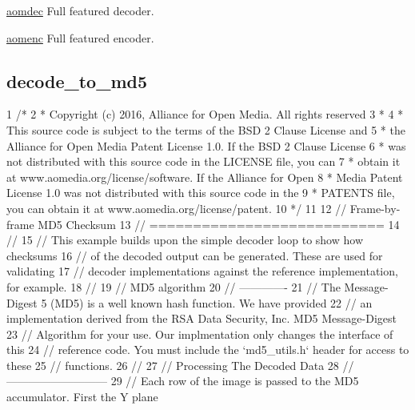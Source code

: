 \begin{DoxyItemize}
\item \hyperlink{example_aomdec}{aomdec} Full featured decoder.
\item \hyperlink{example_aomenc}{aomenc} Full featured encoder. 
\end{DoxyItemize}\hypertarget{example_decode_to_md5}{}\subsection{decode\+\_\+to\+\_\+md5}\label{example_decode_to_md5}

\begin{DoxyCodeInclude}
1 \textcolor{comment}{/*}
2 \textcolor{comment}{ * Copyright (c) 2016, Alliance for Open Media. All rights reserved}
3 \textcolor{comment}{ *}
4 \textcolor{comment}{ * This source code is subject to the terms of the BSD 2 Clause License and}
5 \textcolor{comment}{ * the Alliance for Open Media Patent License 1.0. If the BSD 2 Clause License}
6 \textcolor{comment}{ * was not distributed with this source code in the LICENSE file, you can}
7 \textcolor{comment}{ * obtain it at www.aomedia.org/license/software. If the Alliance for Open}
8 \textcolor{comment}{ * Media Patent License 1.0 was not distributed with this source code in the}
9 \textcolor{comment}{ * PATENTS file, you can obtain it at www.aomedia.org/license/patent.}
10 \textcolor{comment}{ */}
11 
12 \textcolor{comment}{// Frame-by-frame MD5 Checksum}
13 \textcolor{comment}{// ===========================}
14 \textcolor{comment}{//}
15 \textcolor{comment}{// This example builds upon the simple decoder loop to show how checksums}
16 \textcolor{comment}{// of the decoded output can be generated. These are used for validating}
17 \textcolor{comment}{// decoder implementations against the reference implementation, for example.}
18 \textcolor{comment}{//}
19 \textcolor{comment}{// MD5 algorithm}
20 \textcolor{comment}{// -------------}
21 \textcolor{comment}{// The Message-Digest 5 (MD5) is a well known hash function. We have provided}
22 \textcolor{comment}{// an implementation derived from the RSA Data Security, Inc. MD5 Message-Digest}
23 \textcolor{comment}{// Algorithm for your use. Our implmentation only changes the interface of this}
24 \textcolor{comment}{// reference code. You must include the `md5\_utils.h` header for access to these}
25 \textcolor{comment}{// functions.}
26 \textcolor{comment}{//}
27 \textcolor{comment}{// Processing The Decoded Data}
28 \textcolor{comment}{// ---------------------------}
29 \textcolor{comment}{// Each row of the image is passed to the MD5 accumulator. First the Y plane}

\end{DoxyCodeInclude}
